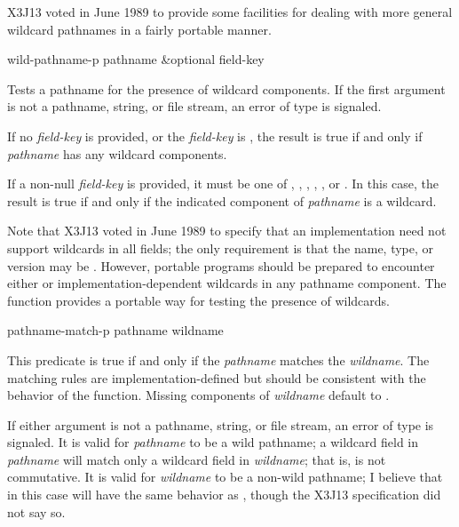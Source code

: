 X3J13 voted in June 1989  to provide
some facilities for dealing with more general wildcard pathnames
in a fairly portable manner.

\begin{defun}[Function]
wild-pathname-p pathname &optional field-key
  
    Tests a pathname for the presence of wildcard components.  If the first
    argument is not a pathname, string, or file stream, an error of type
     is signaled.
  
    If no \emph{field-key} is provided, or the \emph{field-key} is , the result is
    true if and only if \emph{pathname} has any wildcard components.

    If a non-null \emph{field-key} is provided, it must be one of , ,
    , , , or .
    In this case, the result is true if and only
    if the indicated component of \emph{pathname} is a wildcard.

    Note that X3J13 voted in June 1989 
    to specify that an implementation need not support wildcards in all fields;
    the only requirement is that the name, type, or version may be .
    However, portable programs should be prepared to encounter either 
    or implementation-dependent wildcards in any pathname component.
    The function  provides a portable way for testing
    the presence of wildcards.
\end{defun}

\begin{defun}[Function]
pathname-match-p pathname wildname

    This predicate is true if and only if the \emph{pathname}
    matches the \emph{wildname}.  The matching rules
    are implementation-defined but should be consistent with the behavior of the
     function.  Missing components of \emph{wildname} default to .

    If either argument is not a pathname, string, or file stream, an error
    of type  is signaled.  It is valid for \emph{pathname} to be a
    wild pathname; a wildcard field in \emph{pathname} will match only a
    wildcard field in \emph{wildname}; that is,  is not commutative.
    It is valid for \emph{wildname} to be a non-wild pathname;
    I believe that in this case  will have the same
    behavior as , though the X3J13 specification did not say so.
\end{defun}

